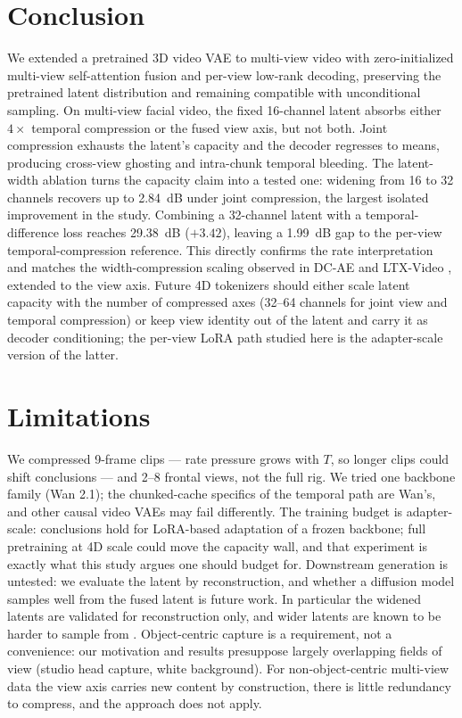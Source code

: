 \section{Conclusion}

We extended a pretrained 3D video VAE to multi-view video with zero-initialized multi-view self-attention fusion and per-view low-rank decoding, preserving the pretrained latent distribution and remaining compatible with unconditional sampling. On multi-view facial video, the fixed 16-channel latent absorbs either $4\times$ temporal compression or the fused view axis, but not both. Joint compression exhausts the latent's capacity and the decoder regresses to means, producing cross-view ghosting and intra-chunk temporal bleeding. The latent-width ablation turns the capacity claim into a tested one: widening from 16 to 32 channels recovers up to 2.84~dB under joint compression, the largest isolated improvement in the study. Combining a 32-channel latent with a temporal-difference loss reaches 29.38~dB (${+}3.42$), leaving a 1.99~dB gap to the per-view temporal-compression reference. This directly confirms the rate interpretation and matches the width-compression scaling observed in DC-AE \cite{chen2024deep} and LTX-Video \cite{hacohen2024ltx}, extended to the view axis. Future 4D tokenizers should either scale latent capacity with the number of compressed axes (32--64 channels for joint view and temporal compression) or keep view identity out of the latent and carry it as decoder conditioning; the per-view LoRA path studied here is the adapter-scale version of the latter.

\section{Limitations}

We compressed 9-frame clips --- rate pressure grows with $T$, so longer clips could shift conclusions --- and 2--8 frontal views, not the full rig. We tried one backbone family (Wan 2.1); the chunked-cache specifics of the temporal path are Wan's, and other causal video VAEs may fail differently. The training budget is adapter-scale: conclusions hold for LoRA-based adaptation of a frozen backbone; full pretraining at 4D scale could move the capacity wall, and that experiment is exactly what this study argues one should budget for. Downstream generation is untested: we evaluate the latent by reconstruction, and whether a diffusion model samples well from the fused latent is future work. In particular the widened latents are validated for reconstruction only, and wider latents are known to be harder to sample from \cite{yao2025vavae}. Object-centric capture is a requirement, not a convenience: our motivation and results presuppose largely overlapping fields of view (studio head capture, white background). For non-object-centric multi-view data the view axis carries new content by construction, there is little redundancy to compress, and the approach does not apply.


